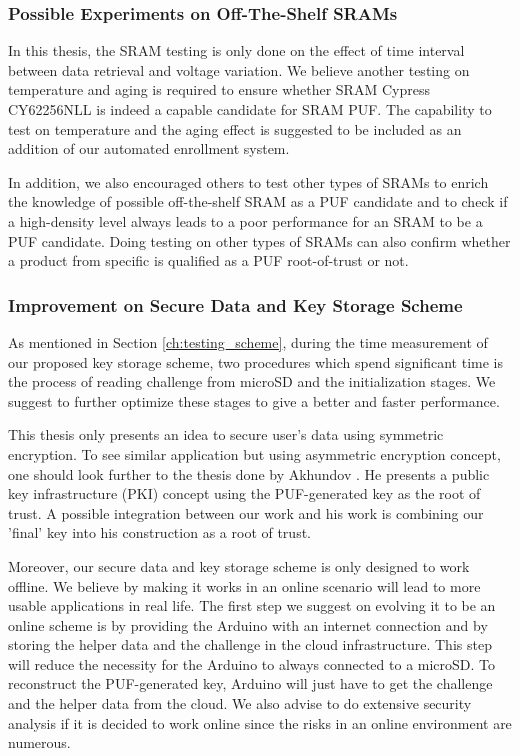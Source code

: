 \subsubsection{Possible Experiments on Off-The-Shelf SRAMs}
In this thesis, the SRAM testing is only done on the effect of time interval between data retrieval and voltage variation. We believe another testing on temperature and aging is required to ensure whether SRAM Cypress CY62256NLL is indeed a capable candidate for SRAM PUF. The capability to test on temperature and the aging effect is suggested to be included as an addition of our automated enrollment system.

In addition, we also encouraged others to test other types of SRAMs to enrich the knowledge of possible off-the-shelf SRAM as a PUF candidate and to check if a high-density level always leads to a poor performance for an SRAM to be a PUF candidate. Doing testing on other types of SRAMs can also confirm whether a product from specific is qualified as a PUF root-of-trust or not.

\subsubsection{Improvement on Secure Data and Key Storage Scheme}
As mentioned in Section \ref{ch:testing_scheme}, during the time measurement of our proposed key storage scheme, two procedures which spend significant time is the process of reading challenge from microSD and the initialization stages. We suggest to further optimize these stages to give a better and faster performance.

This thesis only presents an idea to secure user's data using symmetric encryption. To see similar application but using asymmetric encryption concept, one should look further to the thesis done by Akhundov \cite{haji}. He presents a public key infrastructure (PKI) concept using the PUF-generated key as the root of trust. A possible integration between our work and his work is combining our 'final' key into his construction as a root of trust.

Moreover, our secure data and key storage scheme is only designed to work offline. We believe by making it works in an online scenario will lead to more usable applications in real life. The first step we suggest on evolving it to be an online scheme is by providing the Arduino with an internet connection and by storing the helper data and the challenge in the cloud infrastructure. This step will reduce the necessity for the Arduino to always connected to a microSD. To reconstruct the PUF-generated key, Arduino will just have to get the challenge and the helper data from the cloud. We also advise to do extensive security analysis if it is decided to work online since the risks in an online environment are numerous.

